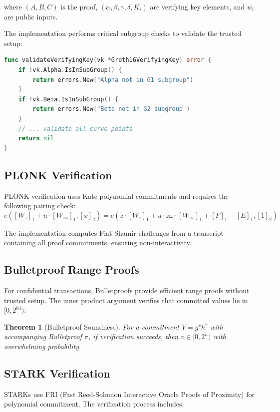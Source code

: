 \documentclass[11pt,a4paper]{article}
\newtheorem{theorem}{Theorem}
\begin{document}
where $(A, B, C)$ is the proof, $(\alpha, \beta, \gamma, \delta, K_i)$ are verifying key elements, and $w_i$ are public inputs.

The implementation performs critical subgroup checks to validate the trusted setup:

\begin{lstlisting}[language=Go,caption={Subgroup Validation}]
func validateVerifyingKey(vk *Groth16VerifyingKey) error {
    if !vk.Alpha.IsInSubGroup() {
        return errors.New("Alpha not in G1 subgroup")
    }
    if !vk.Beta.IsInSubGroup() {
        return errors.New("Beta not in G2 subgroup")
    }
    // ... validate all curve points
    return nil
}
\end{lstlisting}

\subsection{PLONK Verification}

PLONK verification uses Kate polynomial commitments and requires the following pairing check:
\[
e([W_z]_1 + u \cdot [W_{z\omega}]_1, [x]_2) = e(z \cdot [W_z]_1 + u \cdot z\omega \cdot [W_{z\omega}]_1 + [F]_1 - [E]_1, [1]_2)
\]

The implementation computes Fiat-Shamir challenges from a transcript containing all proof commitments, ensuring non-interactivity.

\subsection{Bulletproof Range Proofs}

For confidential transactions, Bulletproofs provide efficient range proofs without trusted setup. The inner product argument verifies that committed values lie in $[0, 2^{64})$:

\begin{theorem}[Bulletproof Soundness]
For a commitment $V = g^v h^r$ with accompanying Bulletproof $\pi$, if verification succeeds, then $v \in [0, 2^n)$ with overwhelming probability.
\end{theorem}

\subsection{STARK Verification}

STARKs use FRI (Fast Reed-Solomon Interactive Oracle Proofs of Proximity) for polynomial commitment. The verification process includes:
\end{document}
